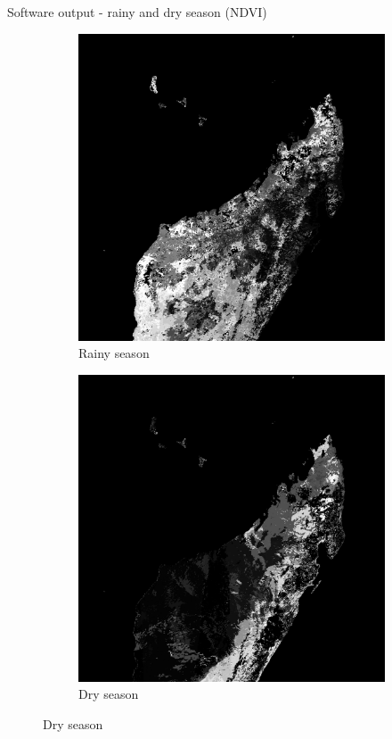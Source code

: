\documentclass[9pt]{beamer}
\begin{document}
\begin{frame}{Software output - rainy and dry season (NDVI)}
	\begin{figure}
		\centering
		\begin{subfigure}{.5\textwidth}
			\centering
			\includegraphics[width=\textwidth]{pic/A2013345.png}
			\caption{Rainy season}
			\label{fig:sub1}
		\end{subfigure}%
		\begin{subfigure}{.5\textwidth}
			\centering
			\includegraphics[width=\textwidth]{pic/A2014153.png}
			\caption{Dry season}
			\label{fig:sub2}
		\end{subfigure}
	\end{figure}

\end{frame}
\end{document}
